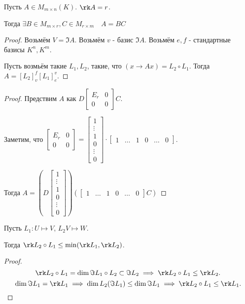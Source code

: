 \begin{theorem} \thmslashn

    Пусть $A\in M_{m \times n}(K)$. $\rk A = r$.

    Тогда $\exists{B\in M_{m \times r}, C\in M_{r \times m}}\quad A = BC $
    \begin{proof} \thmslashn
    
        Возьмём $V = \Im A$. Возьмём $v$ - базис $\Im A$. Возьмём $e, f$ - стандартные базисы $K^{n}, K^{m}$.

        Пусть возмьём такие $L_1, L_2$, такие, что $(x \to Ax) = L_2 \circ L_1$. Тогда $A = [L_2]_{v}^{f}[L_1]_{e}^{v}$.
    \end{proof}
    \begin{proof} \thmslashn
    
        Предствим $A$ как $D \begin{bmatrix} E_{r} & 0\\ 0 & 0 \end{bmatrix} C$.

        Заметим, что $\begin{bmatrix} E_{r} & 0\\ 0 & 0 \end{bmatrix} = \begin{bmatrix} 1\\ \vdots\\ 1\\ 0\\ \vdots\\ 0 \end{bmatrix} \cdot \begin{bmatrix} 1 & \ldots & 1 & 0 & \ldots & 0 \end{bmatrix}  $.

        Тогда $A = \left( D \begin{bmatrix} 1\\ \vdots \\ 1\\ 0\\ \vdots\\ 0 \end{bmatrix}  \right) \left( \begin{bmatrix} 1 & \ldots & 1 & 0 & \ldots & 0 \end{bmatrix}C  \right) $
    \end{proof}
\end{theorem}
\begin{statement} \thmslashn

    Пусть $L_1 : U \mapsto V$, $L_2 V \mapsto W$.

    Тогда $\rk L_2 \circ L_1 \le \min(\rk L_1, \rk L_2)$.
    \begin{proof} \thmslashn
    
       \[ \rk L_2 \circ L_1 = \dim \Im L_1 \circ L_2 \subset \Im L_2 \implies \rk L_2 \circ L_1 \le \rk L_2 .\]
       \[ \dim \Im L_1 = \rk L_1 \implies \dim L_2(\Im L_1) \le \dim \Im L_1 \implies \rk L_2 \circ L_1 \le \rk L_1 .\qedhere\] 
    \end{proof}
\end{statement}
